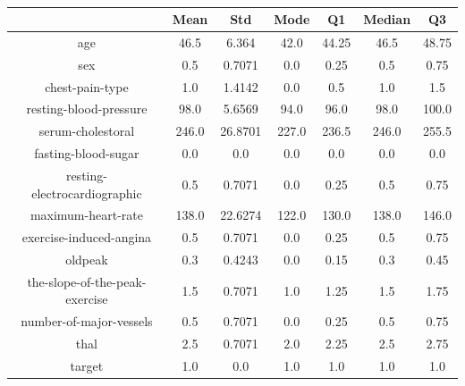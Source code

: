 \documentclass{classrep}
\begin{document}
{{{                \begin{table}[!htbp]
                    \centering
                    \begin{tabular}{|c|c|c|c|c|c|c|}
                        \hline
                        & Mean & Std & Mode & Q1 & Median & Q3 \\ \hline
                        age & 46.5 & 6.364 & 42.0 & 44.25 & 46.5 & 48.75 \\ \hline
                        sex & 0.5 & 0.7071 & 0.0 & 0.25 & 0.5 & 0.75 \\ \hline
                        chest-pain-type & 1.0 & 1.4142 & 0.0 & 0.5 & 1.0 & 1.5 \\ \hline
                        resting-blood-pressure & 98.0 & 5.6569 & 94.0 & 96.0 & 98.0 & 100.0 \\ \hline
                        serum-cholestoral & 246.0 & 26.8701 & 227.0 & 236.5 & 246.0 & 255.5 \\ \hline
                        fasting-blood-sugar & 0.0 & 0.0 & 0.0 & 0.0 & 0.0 & 0.0 \\ \hline
                        resting-electrocardiographic & 0.5 & 0.7071 & 0.0 & 0.25 & 0.5 & 0.75 \\ \hline
                        maximum-heart-rate & 138.0 & 22.6274 & 122.0 & 130.0 & 138.0 & 146.0 \\ \hline
                        exercise-induced-angina & 0.5 & 0.7071 & 0.0 & 0.25 & 0.5 & 0.75 \\ \hline
                        oldpeak & 0.3 & 0.4243 & 0.0 & 0.15 & 0.3 & 0.45 \\ \hline
                        the-slope-of-the-peak-exercise & 1.5 & 0.7071 & 1.0 & 1.25 & 1.5 & 1.75 \\ \hline
                        number-of-major-vessels & 0.5 & 0.7071 & 0.0 & 0.25 & 0.5 & 0.75 \\ \hline
                        thal & 2.5 & 0.7071 & 2.0 & 2.25 & 2.5 & 2.75 \\ \hline
                        target & 1.0 & 0.0 & 1.0 & 1.0 & 1.0 & 1.0 \\ \hline
                    \end{tabular}
                    \caption{}
                    \label{result_30_List-wise-deletion}
                \end{table}
                \FloatBarrier

}}}
\end{document}
